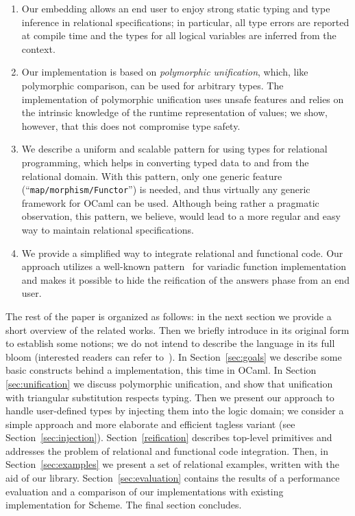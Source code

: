 \begin{enumerate}
\item Our embedding allows an end user to enjoy strong static typing and type inference in relational
specifications; in particular, all type errors are reported at compile time and the types for
all logical variables are inferred from the context.

\item Our implementation is based on \emph{polymorphic unification}, which, like polymorphic comparison,
can be used for arbitrary types. The implementation of polymorphic unification uses unsafe features and
relies on the intrinsic knowledge of the runtime representation of values; we show, however, that this does not
compromise type safety.

\item We describe a uniform and scalable pattern for using types for relational programming, which
helps in converting typed data to and from the relational domain. With this pattern, only one
generic feature (``\lstinline{map/morphism/Functor}'') is needed, and thus virtually any generic 
framework for OCaml can be used. Although being rather a pragmatic observation, this pattern, we
believe, would lead to a more regular and easy way to maintain relational specifications.

\item We provide a simplified way to integrate relational and functional code. Our approach utilizes
a well-known pattern~\cite{Unparsing, DoWeNeed} for variadic function implementation and makes it
possible to hide the reification of the answers phase from an end user.
\end{enumerate}

The rest of the paper is organized as follows: in the next section we provide a short overview of the related
works. Then we briefly introduce \miniKanren in
its original form to establish some notions; we do not intend to describe the language in its full bloom (interested readers can
refer to~\cite{TRS}). In Section~\ref{sec:goals} we describe some basic constructs behind a \miniKanren implementation, this time 
in OCaml. In Section \ref{sec:unification} we discuss polymorphic unification, and show that unification with 
triangular substitution respects typing. Then we present our approach to handle user-defined types by injecting them 
into the logic domain; we consider a simple approach and more elaborate and efficient tagless variant (see Section~\ref{sec:injection}). 
Section~\ref{reification} describes top-level primitives and addresses the problem of relational and functional code integration. 
Then, in Section~\ref{sec:examples} we present a set of relational examples, written with the aid of our 
library. Section~\ref{sec:evaluation} contains the results of a performance evaluation and a comparison of our implementations 
with existing implementation for Scheme. The final section concludes.

